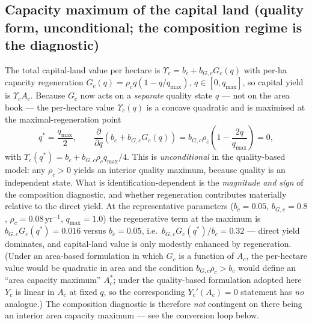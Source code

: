 \documentclass[11pt]{article}
\begin{document}
\subsection{Capacity maximum of the capital land (quality form, unconditional; the composition regime is the diagnostic)}

The total capital-land value per hectare is $\Upsilon_c=b_c+b_{G,c}G_c(q)$ with per-ha capacity regeneration $G_c(q)=\rho_c q(1-q/q_{\max})$, $q\in[0,q_{\max}]$, so capital yield is $\Upsilon_c A_c$. Because $G_c$ now acts on a \emph{separate} quality state $q$ --- not on the area book --- the per-hectare value $\Upsilon_c(q)$ is a concave quadratic and is maximised at the maximal-regeneration point
\[
q^*=\frac{q_{\max}}{2},\qquad \frac{\partial}{\partial q}\left(b_c+b_{G,c}G_c(q)\right)=b_{G,c}\rho_c\left(1-\frac{2q}{q_{\max}}\right)=0,
\]
with $\Upsilon_c(q^*)=b_c+b_{G,c}\rho_c q_{\max}/4$. This is \emph{unconditional} in the quality-based model: any $\rho_c>0$ yields an interior quality maximum, because quality is an independent state. What is identification-dependent is the \emph{magnitude and sign} of the composition diagnostic, and whether regeneration contributes materially relative to the direct yield. At the representative parameters ($b_c=0.05$, $b_{G,c}=0.8$, $\rho_c=0.08\,\text{yr}^{-1}$, $q_{\max}=1.0$) the regenerative term at the maximum is $b_{G,c}G_c(q^*)=0.016$ versus $b_c=0.05$, i.e.\ $b_{G,c}G_c(q^*)/b_c=0.32$ --- direct yield dominates, and capital-land value is only modestly enhanced by regeneration. (Under an area-based formulation in which $G_c$ is a function of $A_c$, the per-hectare value would be quadratic in area and the condition $b_{G,c}\rho_c>b_c$ would define an ``area capacity maximum'' $A_c^*$; under the quality-based formulation adopted here $Y_c$ is linear in $A_c$ at fixed $q$, so the corresponding $Y_c'(A_c)=0$ statement has \emph{no} analogue.) The composition diagnostic is therefore \emph{not} contingent on there being an interior area capacity maximum --- see the conversion loop below.
\end{document}
